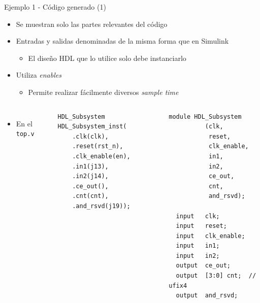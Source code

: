 \documentclass{beamer}
\begin{document}
\begin{frame}[fragile]{Ejemplo 1 - Código generado (1)}
\begin{itemize}
	\item Se muestran solo las partes relevantes del código
	\item Entradas y salidas denominadas de la misma forma que en Simulink
	\begin{itemize}
		\item El diseño HDL que lo utilice solo debe instanciarlo
	\end{itemize}
	\item Utiliza \textit{enables} 
	\begin{itemize}
		\item Permite realizar fácilmente diversos \textit{sample time}
	\end{itemize}
\end{itemize}
\begin{columns}
	\begin{itemize}
		\item En el \texttt{top.v}
	\end{itemize}
\begin{center}\begin{adjustbox}{padding=2pt 0pt 0pt 0pt, cfbox=blue!50 1pt}\begin{lstlisting}[basicstyle=\tiny]
HDL_Subsystem HDL_Subsystem_inst(
	.clk(clk),
	.reset(rst_n),
	.clk_enable(en),
	.in1(j13),
	.in2(j14),
    .ce_out(),
    .cnt(cnt),
    .and_rsvd(j19));
\end{lstlisting}\end{adjustbox}\end{center}
\begin{center}\begin{adjustbox}{padding=2pt 0pt 0pt 0pt, cfbox=blue!50 1pt}\begin{lstlisting}[basicstyle=\tiny]
module HDL_Subsystem
          (clk,
           reset,
           clk_enable,
           in1,
           in2,
           ce_out,
           cnt,
           and_rsvd);

  input   clk;
  input   reset;
  input   clk_enable;
  input   in1;
  input   in2;
  output  ce_out;
  output  [3:0] cnt;  // ufix4
  output  and_rsvd;
\end{lstlisting}\end{adjustbox}\end{center}
\end{columns}
\end{frame}
\end{document}
